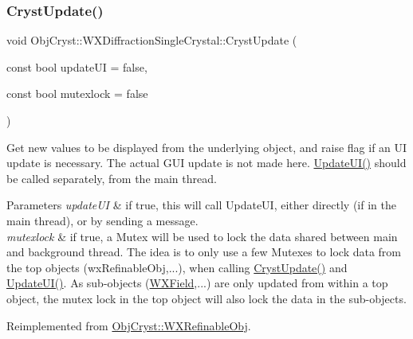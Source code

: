 \subsubsection{\texorpdfstring{CrystUpdate()}{CrystUpdate()}}
{\footnotesize\ttfamily void Obj\+Cryst\+::\+W\+X\+Diffraction\+Single\+Crystal\+::\+Cryst\+Update (\begin{DoxyParamCaption}\item[{const bool}]{update\+UI = {\ttfamily false},  }\item[{const bool}]{mutexlock = {\ttfamily false} }\end{DoxyParamCaption})\hspace{0.3cm}{\ttfamily [virtual]}}

Get new values to be displayed from the underlying object, and raise flag if an UI update is necessary. The actual G\+UI update is not made here. \mbox{\hyperlink{class_obj_cryst_1_1_w_x_diffraction_single_crystal_a2b8ef5fa0663d1526258a17498e9b0fc}{Update\+U\+I()}} should be called separately, from the main thread.


\begin{DoxyParams}{Parameters}
{\em update\+UI} & if true, this will call Update\+UI, either directly (if in the main thread), or by sending a message. \\
\hline
{\em mutexlock} & if true, a Mutex will be used to lock the data shared between main and background thread. The idea is to only use a few Mutexes to lock data from the top objects (wx\+Refinable\+Obj,...), when calling \mbox{\hyperlink{class_obj_cryst_1_1_w_x_diffraction_single_crystal_aa66e0abac5c2e4e24ccb1c982548bd4c}{Cryst\+Update()}} and \mbox{\hyperlink{class_obj_cryst_1_1_w_x_diffraction_single_crystal_a2b8ef5fa0663d1526258a17498e9b0fc}{Update\+U\+I()}}. As sub-\/objects (\mbox{\hyperlink{class_obj_cryst_1_1_w_x_field}{W\+X\+Field}},...) are only updated from within a top object, the mutex lock in the top object will also lock the data in the sub-\/objects. \\
\hline
\end{DoxyParams}


Reimplemented from \mbox{\hyperlink{class_obj_cryst_1_1_w_x_refinable_obj_a8249d288e62ad1ebffeea91f77ae37a3}{Obj\+Cryst\+::\+W\+X\+Refinable\+Obj}}.

